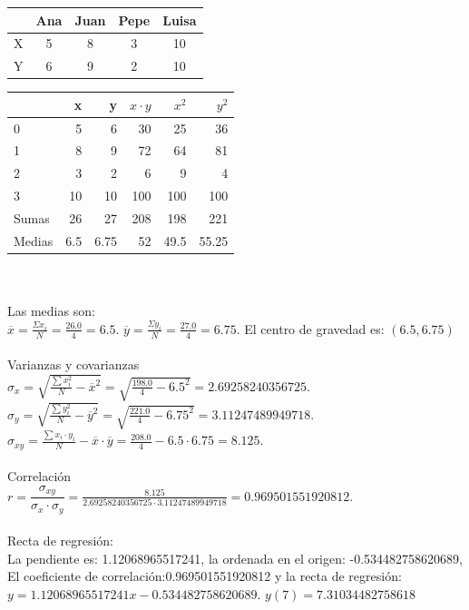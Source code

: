 \documentclass[addpoints,spanish, 12pt,a4paper]{exam}
\begin{document}
\begin{questions}
\begin{tabular}{l|cccc}
{} &  Ana & Juan  &  Pepe &   Luisa \\
\hline
X &  5 &  8 &  3 &  10 \\
Y &  6 &  9 &  2 &  10 \\
\hline
\end{tabular}
\begin{solution}
        \begin{tabular}{lrrrrr}
\hline
        &    x &     y &   $x\cdot y$ &   $x^2$ &   $y^2$ \\
\hline
 0      &  5   &  6    &           30 &    25   &   36    \\
 1      &  8   &  9    &           72 &    64   &   81    \\
 2      &  3   &  2    &            6 &     9   &    4    \\
 3      & 10   & 10    &          100 &   100   &  100    \\
 Sumas  & 26   & 27    &          208 &   198   &  221    \\
 Medias &  6.5 &  6.75 &           52 &    49.5 &   55.25 \\
\hline
\end{tabular}
\\ \\ Las medias son: \\$\overline{x}=\frac{\Sigma{x_i}}{N}=\frac{26.0}{4}=6.5$. $\overline{y}=\frac{\Sigma{y_i}}{N}=\frac{27.0}{4}=6.75$.  El centro de gravedad es: $(6.5,6.75)$ \\ \\ Varianzas y covarianzas\\ $\sigma_x=\sqrt{\frac{\sum{x_i^2}}{N}-\overline{x}^2}=\sqrt{\frac{198.0}{4}-6.5^2}=2.69258240356725$.\\ $\sigma_y=\sqrt{\frac{\sum{y_i^2}}{N}-\overline{y}^2}=\sqrt{\frac{221.0}{4}-6.75^2}=3.11247489949718$.\\ $\sigma_{xy}=\frac{\sum{x_i \cdot y_i}}{N}-\overline{x}\cdot \overline{y}=\frac{208.0}{4}-6.5\cdot 6.75=8.125$. \\ \\ Correlación\\ $r=\dfrac{\sigma_{xy}}{\sigma_x \cdot \sigma_y}=\frac{8.125}{2.69258240356725\cdot 3.11247489949718}=0.969501551920812$. \\ \\ Recta de regresión: \\ La pendiente es: 1.12068965517241, la ordenada en el origen: -0.534482758620689, El coeficiente de correlación:0.969501551920812 y la recta de regresión: $y = 1.12068965517241 x - 0.534482758620689$.
$y(7)=7.31034482758618$
\end{solution}


\end{questions}
\end{document}
